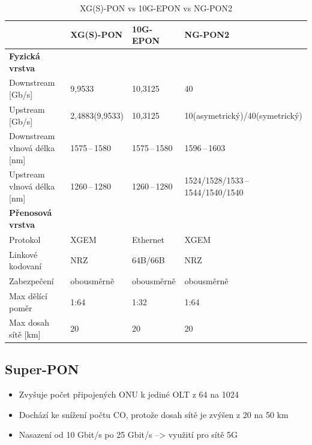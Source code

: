 \begin{table}[ht]
    \centering
    \caption{XG(S)-PON vs 10G-EPON vs NG-PON2}
    \begin{tabular}{|l|l|l|l|}
        \hline
                                     & XG(S)-PON      & 10G-EPON       & NG-PON2                            \\\hline\hline
        \textbf{Fyzická vrstva}      &                &                &                                    \\\hline\hline
        Downstream [Gb/s]            & 9,9533         & 10,3125        & 40                                 \\\hline
        Upstream [Gb/s]              & 2,4883(9,9533) & 10,3125        & 10(asymetrický)/40(symetrický)     \\\hline
        Downstream vlnová délka [nm] & 1575\,--\,1580 & 1575\,--\,1580 & 1596\,--\,1603                     \\\hline
        Upstream vlnová délka [nm]   & 1260\,--\,1280 & 1260\,--\,1280 & 1524/1528/1533\,--\,1544/1540/1540 \\\hline\hline
        \textbf{Přenosová vrstva}    &                &                &                                    \\\hline\hline
        Protokol                     & XGEM           & Ethernet       & XGEM                               \\\hline
        Linkové kodovaní             & NRZ            & 64B/66B        & NRZ                                \\\hline
        Zabezpečení                  & obousměrně     & obousměrně     & obousměrně                         \\\hline
        Max dělící poměr             & 1:64           & 1:32           & 1:64                               \\\hline
        Max dosah sítě [km]          & 20             & 20             & 20                                 \\\hline
    \end{tabular}
\end{table}

\subsection{Super-PON}
\begin{itemize}
    \item Zvyšuje počet připojených ONU k jediné OLT z 64 na 1024
    \item Dochází ke snížení počtu CO, protože dosah sítě je zvýšen z 20 na 50 km
    \item Nasazení od 10 Gbit/s po 25 Gbit/s –> využití pro sítě 5G
\end{itemize}

